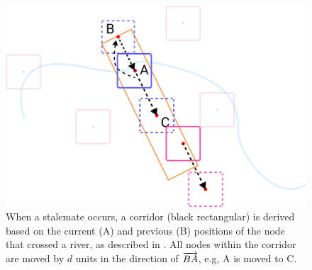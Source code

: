 {
\begin{figure}[tb!]
    \centering
    \includegraphics[width=\columnwidth]{figure/corridor.png}
    \caption{When a stalemate occurs, a corridor (black rectangular) is derived based on the current (A) and previous (B) positions of the node that crossed a river, as described in . All nodes within the corridor are moved by $ d $ units in the direction of $ \protect\overrightarrow{BA} $, e.g, A is moved to C. }
    \label{fig:corridor}
\end{figure}
}


